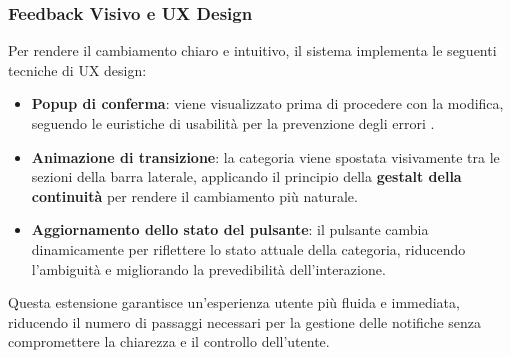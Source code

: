 \subsubsection{Feedback Visivo e UX Design}
Per rendere il cambiamento chiaro e intuitivo, il sistema implementa le seguenti tecniche di UX design:
\begin{itemize}
    \item \textbf{Popup di conferma}: viene visualizzato prima di procedere con la modifica, seguendo le euristiche di usabilità per la prevenzione degli errori \cite{nielsen1995}.
    \item \textbf{Animazione di transizione}: la categoria viene spostata visivamente tra le sezioni della barra laterale, applicando il principio della \textbf{gestalt della continuità} \cite{miller1956} per rendere il cambiamento più naturale.
    \item \textbf{Aggiornamento dello stato del pulsante}: il pulsante cambia dinamicamente per riflettere lo stato attuale della categoria, riducendo l’ambiguità e migliorando la prevedibilità dell’interazione.
\end{itemize}

Questa estensione garantisce un’esperienza utente più fluida e immediata, riducendo il numero di passaggi necessari per la gestione delle notifiche senza compromettere la chiarezza e il controllo dell’utente.


